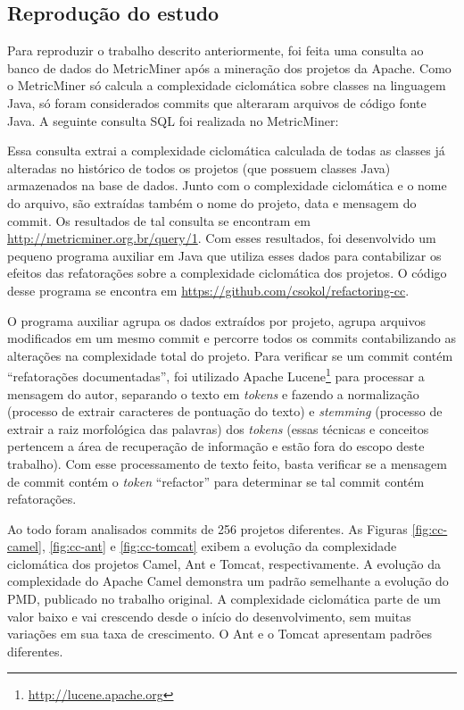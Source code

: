 \documentclass[a4paper, 12pt, twoside]{book}
\begin{document}
        \subsection*{Reprodução do estudo}
        Para reproduzir o trabalho descrito anteriormente, foi feita uma consulta ao banco de dados do MetricMiner após a mineração dos projetos da Apache. Como o MetricMiner só calcula a complexidade ciclomática sobre classes na linguagem Java, só foram considerados commits que alteraram arquivos de código fonte Java. A seguinte consulta SQL foi realizada no MetricMiner:

        

        Essa consulta extrai a complexidade ciclomática calculada de todas as classes já alteradas no histórico de todos os projetos (que possuem classes Java) armazenados na base de dados. Junto com o complexidade ciclomática e o nome do arquivo, são extraídas também o nome do projeto, data e mensagem do commit. Os resultados de tal consulta se encontram em \url{http://metricminer.org.br/query/1}. Com esses resultados, foi desenvolvido um pequeno programa auxiliar em Java que utiliza esses dados para contabilizar os efeitos das refatorações sobre a complexidade ciclomática dos projetos. O código desse programa se encontra em \url{https://github.com/csokol/refactoring-cc}.

        O programa auxiliar agrupa os dados extraídos por projeto, agrupa arquivos modificados em um mesmo commit e percorre todos os commits contabilizando as alterações na complexidade total do projeto. Para verificar se um commit contém ``refatorações documentadas'', foi utilizado Apache Lucene\footnote{\url{http://lucene.apache.org}} para processar a mensagem do autor, separando o texto em \textit{tokens} e fazendo a normalização (processo de extrair caracteres de pontuação do texto) e \textit{stemming} (processo de extrair a raiz morfológica das palavras) dos \textit{tokens} (essas técnicas e conceitos pertencem a área de recuperação de informação e estão fora do escopo deste trabalho). Com esse processamento de texto feito, basta verificar se a mensagem de commit contém o  \textit{token} ``refactor'' para determinar se tal commit contém refatorações.

        Ao todo foram analisados commits de 256 projetos diferentes. As Figuras \ref{fig:cc-camel}, \ref{fig:cc-ant} e \ref{fig:cc-tomcat} exibem a evolução da complexidade ciclomática dos projetos Camel, Ant e Tomcat, respectivamente. A evolução da complexidade do Apache Camel demonstra um padrão semelhante a evolução do PMD, publicado no trabalho original. A complexidade ciclomática parte de um valor baixo e vai crescendo desde o início do desenvolvimento, sem muitas variações em sua taxa de crescimento. O Ant e o Tomcat apresentam padrões diferentes. 
\end{document}
